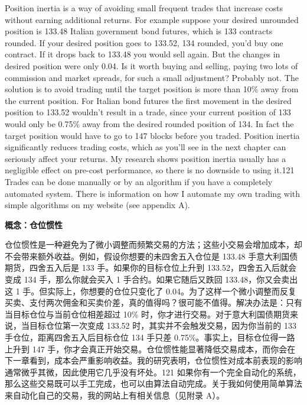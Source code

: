 \begin{englishblock} Position inertia is a way of avoiding small frequent trades that increase costs without earning additional returns. For example suppose your desired unrounded position is 133.48 Italian government bond futures, which is 133 contracts rounded. If your desired position goes to 133.52, 134 rounded, you’d buy one contract. If it drops back to 133.48 you would sell again. But the changes in desired position were only 0.04. Is it worth buying and selling, paying two lots of commission and market spreads, for such a small adjustment? Probably not. The solution is to avoid trading until the target position is more than 10\% away from the current position. For Italian bond futures the first movement in the desired position to 133.52 wouldn’t result in a trade, since your current position of 133 would only be 0.75\% away from the desired rounded position of 134. In fact the target position would have to go to 147 blocks before you traded. Position inertia significantly reduces trading costs, which as you’ll see in the next chapter can seriously affect your returns. My research shows position inertia usually has a negligible effect on pre-cost performance, so there is no downside to using it.121 Trades can be done manually or by an algorithm if you have a completely automated system. There is information on how I automate my own trading with simple algorithms on my website (see appendix A). \end{englishblock}

\medskip \noindent\textbf{概念：仓位惯性}

\begin{chineseblock}仓位惯性是一种避免为了微小调整而频繁交易的方法；这些小交易会增加成本，却不会带来额外收益。例如，假设你想要的未四舍五入仓位是 133.48 手意大利国债期货，四舍五入后是 133 手。如果你的目标仓位上升到 133.52，四舍五入后就会变成 134 手，那么你就会买入 1 手合约。如果它随后又跌回 133.48，你又会卖出这 1 手。但实际上，你想要的仓位只变化了 0.04。为了这样一个微小调整而反复买卖、支付两次佣金和买卖价差，真的值得吗？很可能不值得。解决办法是：只有当目标仓位与当前仓位相差超过 10\% 时，你才进行交易。对于意大利国债期货来说，当目标仓位第一次变成 133.52 时，其实并不会触发交易，因为你当前的 133 手仓位，距离四舍五入后目标仓位 134 手只差 0.75\%。事实上，目标仓位得一路上升到 147 手，你才会真正开始交易。仓位惯性能显著降低交易成本，而你会在下一章看到，成本会严重影响收益。我的研究表明，仓位惯性对成本前表现的影响通常微乎其微，因此使用它几乎没有坏处。121 如果你有一个完全自动化的系统，那么这些交易既可以手工完成，也可以由算法自动完成。关于我如何使用简单算法来自动化自己的交易，我的网站上有相关信息（见附录 A）。\end{chineseblock}

